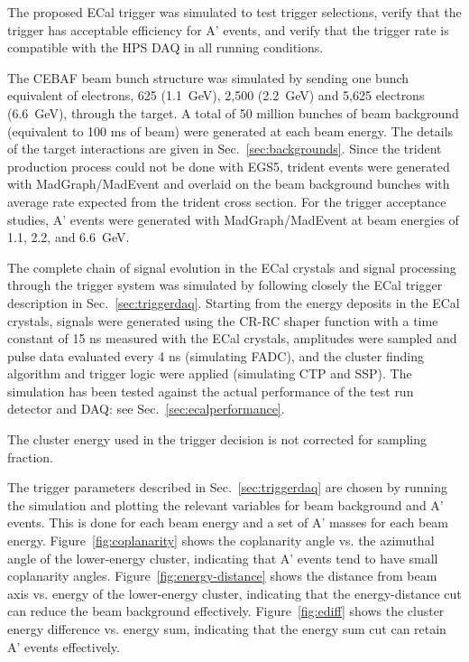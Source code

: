 The proposed ECal trigger was simulated to test trigger selections, verify
that the trigger has acceptable efficiency for A' events, and verify 
that the trigger rate is compatible with the HPS DAQ in all running conditions. 

The CEBAF beam bunch structure was simulated by sending one bunch 
equivalent of electrons, 
625 (1.1~GeV), 2,500 (2.2~GeV) and 5,625 electrons (6.6~GeV), through 
the target. A total of 50 million bunches of beam background 
(equivalent to 100 ms of beam) were 
generated at each beam energy. The details of the target interactions are given in Sec.~\ref{sec:backgrounds}.
Since the trident production process 
could not be done with EGS5, trident events were generated with MadGraph/MadEvent 
and overlaid on the beam background bunches with average rate 
expected from the trident cross section.
For the trigger acceptance studies, A' events were generated with 
MadGraph/MadEvent at beam energies of 1.1, 2.2, and 6.6~GeV.

The complete chain of signal evolution in the ECal crystals and 
signal processing through the trigger system was simulated
by following closely the ECal trigger description in Sec.~\ref{sec:triggerdaq}. 
Starting from the energy deposits in the ECal crystals, signals were 
generated using the CR-RC shaper function with a time constant of 15 ns
measured with the ECal crystals, amplitudes were sampled and pulse data 
evaluated every 4 ns (simulating FADC), and the cluster 
finding algorithm and trigger logic were applied (simulating CTP and SSP). 
The simulation has been tested against the actual performance of the test run detector and DAQ: see Sec.~\ref{sec:ecalperformance}.

The cluster energy used in the trigger decision is not corrected for sampling fraction.

The trigger parameters described in Sec.~\ref{sec:triggerdaq} are 
chosen by running the simulation and plotting the relevant variables 
for beam background and A' events. This is done for each beam energy 
and a set of A' masses for each beam energy. 
Figure~\ref{fig:coplanarity} shows the coplanarity angle vs. the azimuthal 
angle of the lower-energy cluster, indicating that A' events 
tend to have small coplanarity angles. Figure~\ref{fig:energy-distance} shows
the distance from beam axis vs. energy of the lower-energy cluster,
indicating that the energy-distance cut can reduce the beam background effectively.
Figure~\ref{fig:ediff} shows the cluster energy difference vs. energy sum,
indicating that the energy sum cut can retain A' events effectively.       


